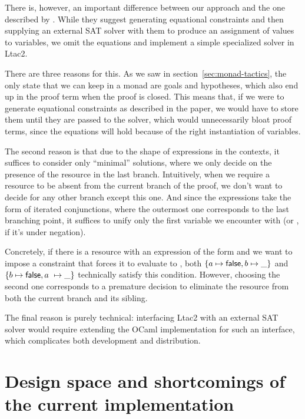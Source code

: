 There is, however, an important difference between our approach and the one described by \citet{harlandResourceDistributionBooleanConstraints2003}.
While they suggest generating equational constraints and then supplying an external SAT solver with them to produce an assignment of values to variables, we omit the equations and implement a simple specialized solver in Ltac2.

There are three reasons for this.
As we saw in section~\ref{sec:monad-tactics}, the only state that we can keep in a monad are goals and hypotheses, which also end up in the proof term when the proof is closed.
This means that, if we were to generate equational constraints as described in the paper, we would have to store them until they are passed to the solver, which would unnecessarily bloat proof terms, since the equations will hold because of the right instantiation of variables.

The second reason is that due to the shape of expressions in the contexts, it suffices to consider only ``minimal'' solutions, where we only decide on the presence of the resource in the last branch.
Intuitively, when we require a resource to be absent from the current branch of the proof, we don't want to decide for any other branch except this one.
And since the expressions take the form of iterated conjunctions, where the outermost one corresponds to the last branching point, it suffices to unify only the first variable we encounter with \false (or \true, if it's under negation).

Concretely, if there is a resource with an expression of the form  and we want to impose a constraint that forces it to evaluate to \false, both \(\left\{a \mapsto \textsf{false}, b \mapsto \_\right\} \) and \(\left\{b \mapsto \textsf{false}, a\ \mapsto \_\right\}\) technically satisfy this condition.
However, choosing the second one corresponds to a premature decision to eliminate the resource from both the current branch and its sibling.

The final reason is purely technical: interfacing Ltac2 with an external SAT solver would require extending the OCaml implementation for such an interface, which complicates both development and distribution.

\section{Design space and shortcomings of the current implementation}
\label{sec:poss-designs-comp}

